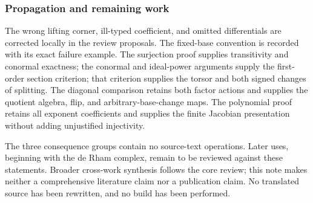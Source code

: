 \subsubsection{Propagation and remaining work}\label{propagation-and-remaining-work}

The wrong lifting corner, ill-typed coefficient, and omitted differentials are corrected locally in the review proposals. The fixed-base convention is recorded with its exact failure example. The surjection proof supplies transitivity and conormal exactness; the conormal and ideal-power arguments supply the first-order section criterion; that criterion supplies the torsor and both signed changes of splitting. The diagonal comparison retains both factor actions and supplies the quotient algebra, flip, and arbitrary-base-change maps. The polynomial proof retains all exponent coefficients and supplies the finite Jacobian presentation without adding unjustified injectivity.

The three consequence groups contain no source-text operations. Later uses, beginning with the de Rham complex, remain to be reviewed against these statements. Broader cross-work synthesis follows the core review; this note makes neither a comprehensive literature claim nor a publication claim. No translated source has been rewritten, and no build has been performed.
